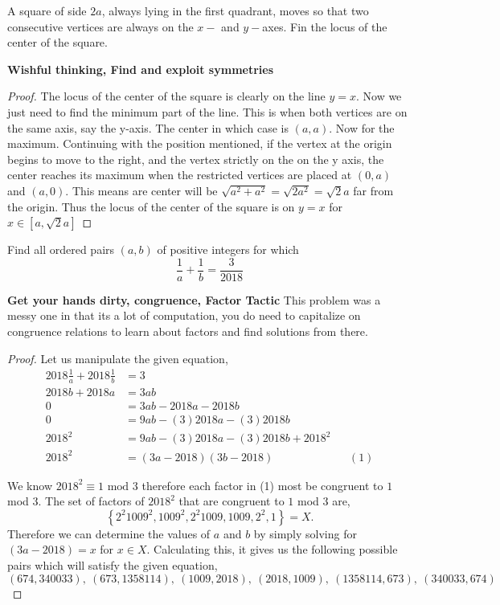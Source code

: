 \documentclass[11pt]{article}
\newenvironment{problem}[2][Problem\!]{\begin{trivlist}
\item[\hskip \labelsep {\bfseries #1}\hskip \labelsep {\bfseries #2}]}{\end{trivlist}}
\newcommand{\set}[1]{\left\{#1\right\}} %
\begin{document}
\begin{tcolorbox}
    \begin{problem} {IC | 11/29 | PP15}
        A square of side $2a$, always lying in the first quadrant, moves so that two consecutive vertices are always on the $x-$ and $y-$axes. Fin the locus of the center of the square.
    \end{problem}
    \textbf{Wishful thinking, Find and exploit symmetries}
\end{tcolorbox}
\begin{proof}
    The locus of the center of the square is clearly on the line $y = x$. Now we just need to find the minimum part of the line. This is when both vertices are on the same axis, say the y-axis. The center in which case is $(a,a)$. Now for the maximum. Continuing with the position mentioned, if the vertex at the origin begins to move to the right, and the vertex strictly on the on the y axis, the center reaches its maximum when the restricted vertices are placed at $(0,a)$ and $(a,0)$. This means are center will be $\sqrt{a^{2} + a^{2}} = \sqrt{2a^{2}} = \sqrt{2}a$ far from the origin. Thus the locus of the center of the square is on $y=x$ for $x \in [a, \sqrt{2}a]$
\end{proof}

\begin{tcolorbox}
    \begin{problem} {OC | 11/22 | PP 19}
        Find all ordered pairs $(a,b)$ of positive integers for which
        \[\frac{1}{a} + \frac{1}{b} = \frac{3}{2018}\]
    \end{problem}
    \textbf{Get your hands dirty, congruence, Factor Tactic} This problem was a messy one in that its a lot of computation, you do need to capitalize on congruence relations to learn about factors and find solutions from there. 
\end{tcolorbox}
\begin{proof}
    Let us manipulate the given equation,
    \begin{align*}
         2018\frac{1}{a} + 2018\frac{1}{b} &= 3 \\
         2018b + 2018a &= 3ab \\
         0 &= 3ab -2018a -2018b \\
         0 &= 9ab - (3)2018a - (3)2018b \\
         2018^{2} &= 9ab -(3)2018a - (3)2018b + 2018^{2} \\
         2018^{2} &= (3a-2018)(3b - 2018) && (1)
    \end{align*}

    We know $2018^{2} \equiv 1 \text{ mod }3$ therefore each factor in (1) most be congruent to $1$ mod $3$. The set of factors of $2018^{2}$ that are congruent to $1$ mod $3$ are,
    \[\set{2^{2}1009^{2}, 1009^{2}, 2^{2}1009, 1009, 2^{2}, 1} = X.\]
    Therefore we can determine the values of $a$ and $b$ by simply solving for $(3a - 2018) = x $ for $x \in X$. Calculating this, it gives us the following possible pairs which will satisfy the given equation,
    \[(674, 340033),\ (673, 1358114),\ (1009,2018), \ (2018,1009), \ (1358114, 673), \ (340033, 674)\] 
\end{proof}
\end{document}
